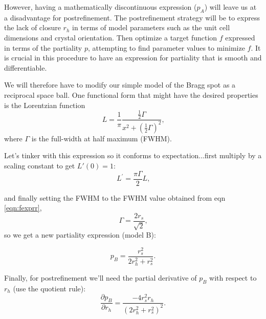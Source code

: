 \documentclass[12pt, letterpaper]{article}
\begin{document}
However, having a 
mathematically discontinuous
expression ($p_A$) will leave us at a disadvantage for postrefinement.  The postrefinement strategy  
will be to express the lack of closure $r_h$ in terms of model parameters such as the unit cell
dimensions and crystal orientation.  Then optimize a target function $f$ expressed in 
terms of the partiality $p$, attempting to find parameter values to minimize $f$.  It is 
crucial in this procedure to have an expression for partiality that is smooth and differentiable. 

We will therefore have to modify our simple model of the Bragg spot as a reciprocal space ball.  
One functional form that might have the desired properties is the Lorentzian function
  \begin{equation}
    L = \frac{1}{\pi}\frac{\frac{1}{2}\Gamma}{x^2 + (\frac{1}{2}\Gamma)^2}
    \text{,}
    \label{eqn:loren}
  \end{equation}
where $\Gamma$ is the full-width at half maximum (FWHM).  

Let's tinker with this expression so it conforms to expectation...first multiply by 
a scaling constant to get $L'(0)=1$:
  \begin{equation}
    L^{\prime} = \frac{\pi \Gamma}{2}L
    \text{,}
    \label{eqn:lorenA}
  \end{equation}

and finally setting the FWHM to the FWHM value obtained from eqn \eqref{eqn:fexprr},
  \begin{equation}
    \Gamma = \frac{2r_s}{\sqrt{2}}
    \text{,}
    \label{eqn:fwhm}
  \end{equation}
so we get a new partiality expression (model B):

  \begin{equation}
    p_B = \frac{r_s^2}{2r_h^2 + r_s^2}
    \text{.}
    \label{eqn:pb}
  \end{equation}

Finally, for postrefinement we'll need the partial derivative of $p_B$ with respect to $r_h$ (use the 
quotient rule):
  \begin{equation}
    \frac{\partial{p_B}}{\partial{r_h}} = \frac{-4r_s^2r_h}{(2r_h^2 + r_s^2)^2}
    \text{.}
    \label{eqn:deriv}
  \end{equation}
\end{document}
